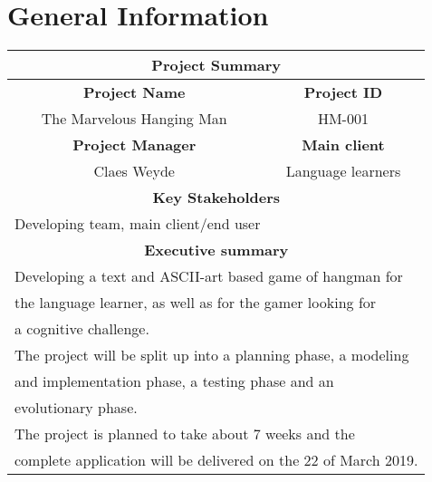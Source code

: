 \documentclass[12pt, letterpaper]{article}
\begin{document}
\section{General Information}
\begin{tabular}{ |c|c|  }
	\hline
	\multicolumn{2}{|c|}{\textbf{Project Summary}} \\
	\hline
	\textbf{Project Name} & \textbf{Project ID} \\
	\hline
	The Marvelous Hanging Man & HM-001 \\
	\hline
	\textbf{Project Manager} & \textbf{Main client} \\
	\hline
	Claes Weyde & Language learners   \\
	\hline
	\multicolumn{2}{|c|}{\textbf{Key Stakeholders}}\\
	\hline
	\multicolumn{2}{|l|}{Developing team, main client/end user}\\
	\hline
	\multicolumn{2}{|c|}{\textbf{Executive summary}}\\
	\hline
	\multicolumn{2}{|l|}{Developing a text and ASCII-art based game of hangman for}\\
	\multicolumn{2}{|l|}{the language learner, as well as for the gamer looking for}\\
	\multicolumn{2}{|l|}{a cognitive challenge.}\\
	\multicolumn{2}{|l|}{The project will be split up into a planning phase, a modeling}\\
	\multicolumn{2}{|l|}{ and implementation phase, a testing phase and an}\\
	\multicolumn{2}{|l|}{ evolutionary phase.}\\
	\multicolumn{2}{|l|}{The project is planned to take about 7 weeks and the  }\\
	\multicolumn{2}{|l|}{complete application will be delivered on the 22 of March 2019.}\\

	\hline
	
\end{tabular}
\newpage
\end{document}
